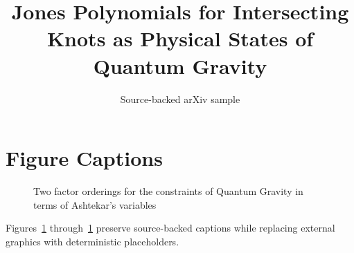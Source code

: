 \documentclass[11pt]{article}
\title{Jones Polynomials for Intersecting Knots as Physical States of Quantum
  Gravity}
\author{Source-backed arXiv sample}
\date{}
\begin{document}
\maketitle
\section{Figure Captions}

\begin{figure}[htbp]
\centering
\fbox{\rule{0pt}{1.15in}\rule{0.78\linewidth}{0pt}}
\caption{Two factor orderings for the constraints of Quantum Gravity in terms of Ashtekar's variables}
\label{fig:source-1}
\end{figure}


Figures~\ref{fig:source-1} through~\ref{fig:source-1} preserve source-backed captions while replacing external graphics with deterministic placeholders.
\end{document}
